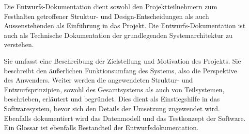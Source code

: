Die Entwurfs-Dokumentation dient sowohl den Projektteilnehmern zum
Festhalten getroffener Struktur- und Design-Entscheidungen als auch
Aussenstehenden als Einführung in das Projekt.
Die Entwurfs-Dokumentation ist auch als Technische Dokumentation der
grundlegenden Systemarchitektur zu verstehen.

Sie umfasst eine Beschreibung der Zielstellung und Motivation des
Projekts.
Sie beschreibt den äußerlichen Funktionsumfang des Systems, also die
Perspektive des Anwenders.
Weiter werden die angewendeten Struktur- und Entwurfsprinzipien,
sowohl des Gesamtsystems als auch von Teilsystemen, beschrieben,
erläutert und begründet. Dies dient als Einstiegshilfe in das
Softwaresystem, bevor sich den Details der Umsetzung zugewendet wird.
Ebenfalls dokumentiert wird das Datenmodell und das Testkonzept der
Software.
Ein Glossar ist ebenfalls Bestandteil der Entwurfsdokumentation.


